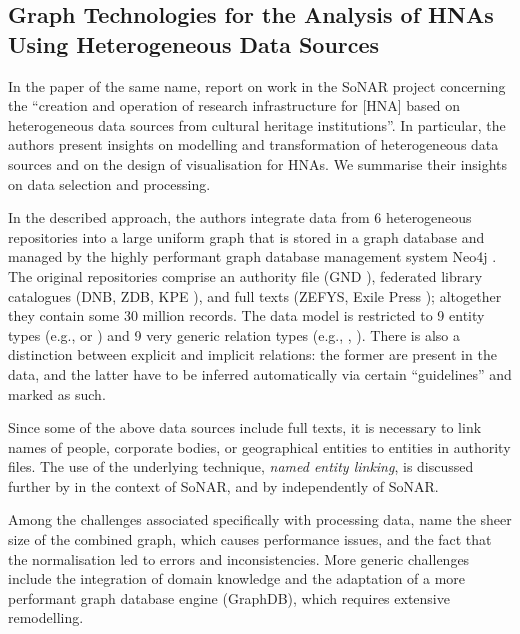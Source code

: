 \subsection{Graph Technologies for the Analysis of HNAs Using Heterogeneous Data Sources}

In the paper of the same name, \textcite{Menzel2020} report on
work in the SoNAR project concerning the 
\enquote{creation and operation of research infrastructure
for [HNA] based on heterogeneous data sources from cultural heritage institutions}.
In particular, the authors present insights on modelling and transformation
of heterogeneous data sources and on the design of visualisation for HNAs.
We summarise their insights on data selection and processing.

In the described approach, the authors integrate data from 6 heterogeneous repositories
into a large uniform graph that is stored in a graph database
and managed by the highly performant graph database management system Neo4j \autocite{Neo4j}.
The original repositories comprise an authority file (GND \autocite{GND}),
federated library catalogues (DNB, ZDB, KPE \autocite{DNBCatalogue,ZDB,KPE}),
and full texts (ZEFYS, Exile Press \autocite{ZEFYS,ExilePress});
altogether they contain some 30 million records.
The data model is restricted to 9 entity types (e.g.,  or )
and 9 very generic relation types (e.g., , ).
There is also a distinction between explicit and implicit relations:
the former are present in the data, and the latter have to be inferred automatically via
certain \enquote{guidelines} and marked as such.

Since some of the above data sources include full texts,
it is necessary to link names of people, corporate bodies, or geographical entities
to entities in authority files. The use of the underlying technique,
\emph{named entity linking}, is discussed further by \textcite{Menzel2021}
in the context of SoNAR,
and by \textcite{Meiners2022} independently of SoNAR.

Among the challenges associated specifically with processing data,
\textcite{Menzel2020} name
the sheer size of the combined graph, which causes performance issues,
and the fact that the normalisation led to errors and inconsistencies.
More generic challenges include the integration of domain knowledge
and the adaptation of a more performant graph database engine (GraphDB),
which requires extensive remodelling.

